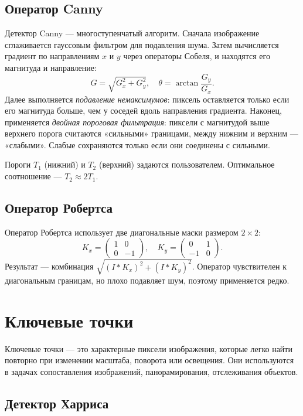 \documentclass[a4paper,12pt]{article}
\begin{document}
\subsection{Оператор Canny}

Детектор Canny --- многоступенчатый алгоритм. Сначала изображение сглаживается гауссовым фильтром для подавления шума. Затем вычисляется градиент по направлениям $x$ и $y$ через операторы Собеля, и находятся его магнитуда и направление:
\[
G = \sqrt{G_x^2 + G_y^2}, \quad \theta = \arctan\frac{G_y}{G_x}.
\]
Далее выполняется \emph{подавление немаксимумов}: пиксель оставляется только если его магнитуда больше, чем у соседей вдоль направления градиента. Наконец, применяется \emph{двойная пороговая фильтрация}: пиксели с магнитудой выше верхнего порога считаются «сильными» границами, между нижним и верхним --- «слабыми». Слабые сохраняются только если они соединены с сильными.

Пороги $T_1$ (нижний) и $T_2$ (верхний) задаются пользователем. Оптимальное соотношение --- $T_2 \approx 2 T_1$.

\subsection{Оператор Робертса}

Оператор Робертса использует две диагональные маски размером $2 \times 2$:
\[
K_x = \begin{pmatrix} 1 & 0 \\ 0 & -1 \end{pmatrix}, \quad
K_y = \begin{pmatrix} 0 & 1 \\ -1 & 0 \end{pmatrix}.
\]
Результат --- комбинация $\sqrt{(I * K_x)^2 + (I * K_y)^2}$. Оператор чувствителен к диагональным границам, но плохо подавляет шум, поэтому применяется редко.

\section{Ключевые точки}

Ключевые точки --- это характерные пиксели изображения, которые легко найти повторно при изменении масштаба, поворота или освещения. Они используются в задачах сопоставления изображений, панорамирования, отслеживания объектов.

\subsection{Детектор Харриса}
\end{document}
